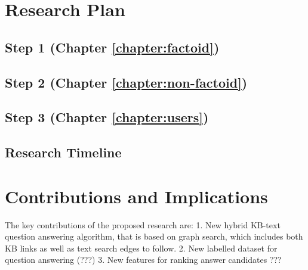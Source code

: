 \section{Research Plan}

\subsection{Step 1 (Chapter \ref{chapter:factoid})}
\label{sec:plan1}

\subsection{Step 2 (Chapter \ref{chapter:non-factoid})}
\label{sec:plan2}

\subsection{Step 3 (Chapter \ref{chapter:users})}
\label{sec:plan3}

\subsection{Research Timeline}




\section{Contributions and Implications}

The key contributions of the proposed research are:
1. New hybrid KB-text question answering algorithm, that is based on graph search, which includes both KB links as well as text search edges to follow.
2. New labelled dataset for question answering (???)
3. New features for ranking answer candidates ???

